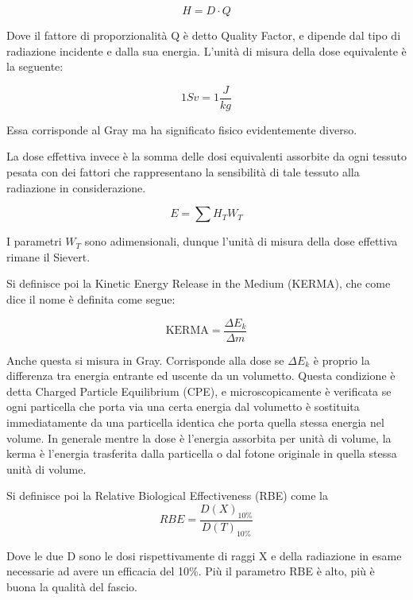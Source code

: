 \begin{equation}
H=D\cdot Q
\end{equation}

Dove il fattore di proporzionalità Q è detto Quality Factor, e dipende dal tipo di radiazione incidente e dalla sua energia.
L'unità di misura della dose equivalente è la seguente:

\begin{equation}
1 Sv = 1 \frac{J}{kg}
\end{equation}

Essa corrisponde al Gray ma ha significato fisico evidentemente diverso.

La dose effettiva invece è la somma delle dosi equivalenti assorbite da ogni tessuto pesata con dei fattori che rappresentano la sensibilità di tale tessuto alla radiazione in considerazione.

\begin{equation}
E=\sum H_{T} W_{T}
\end{equation}

I parametri $W_{T}$ sono adimensionali, dunque l'unità di misura della dose effettiva rimane il Sievert.

Si definisce poi la Kinetic Energy Release in the Medium (KERMA), che come dice il nome è definita come segue:

\begin{equation}
\text{KERMA}=\frac{\Delta E_k}{\Delta m}
\end{equation}

Anche questa si misura in Gray. Corrisponde alla dose se $\Delta E_k$ è proprio la differenza tra energia entrante ed uscente da un volumetto.
Questa condizione è detta Charged Particle Equilibrium (CPE), e microscopicamente è verificata se ogni particella che porta via una certa energia dal volumetto è sostituita immediatamente da una particella identica che porta quella stessa energia nel volume. 
In generale mentre la dose è l'energia assorbita per unità di volume, la kerma è l'energia trasferita dalla particella o dal fotone originale in quella stessa unità di volume.

Si definisce poi la Relative Biological Effectiveness (RBE) come la
\begin{equation}
RBE=\frac{D(X)_{10\%}}{D(T)_{10\%}}
\end{equation}

Dove le due D sono le dosi rispettivamente di raggi X e della radiazione in esame necessarie ad avere un efficacia del 10\%. Più il parametro RBE è alto, più è buona la qualità del fascio.


